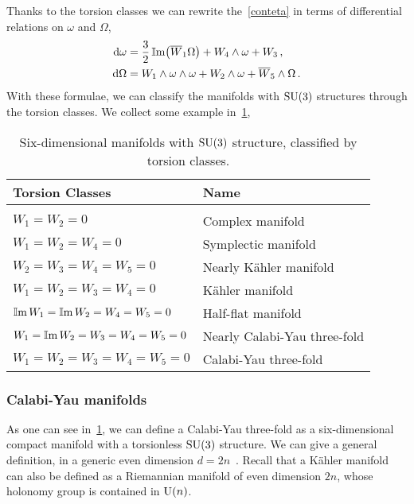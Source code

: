 \documentclass[debug]{phd}
\begin{document}
				Thanks to the torsion classes we can rewrite the~\eqref{conteta} in terms of differential relations on $\omega$ and $\Omega$,
						\begin{subequations}
						\label{diffstruct}
							\begin{align}
								\dd \omega 	&= \frac{3}{2} \IIm \left( \overline{W}_1 \Omega \right) + W_4 \wedge \omega + W_3 \, , \\
								\dd \Omega	&= W_1 \wedge \omega \wedge \omega + W_2 \wedge \omega + \overline{W}_5 \wedge \Omega \, .
							\end{align}
						\end{subequations}
				With these formulae, we can classify the manifolds with $\mathrm{SU}(3)$ structures through the torsion classes.
				We collect some example in~\cref{tabTorsCl},
						\begin{table}[h!]
						\centering
							\begin{tabular}{l | l}
								Torsion Classes						&			Name							\\
								\hline
																	&											\\[-.3mm]
								$W_1 = W_2 = 0$						& 			Complex manifold					\\[1.5mm]	
								$W_1 = W_2 = W_4 = 0$					&			Symplectic manifold					\\[1.5mm]	
								$W_2 = W_3 = W_4 = W_5 = 0$ 			&			Nearly K\"ahler	manifold				\\[1.5mm]
								$W_1 = W_2 = W_3 = W_4 = 0$			&			K\"ahler manifold					\\[1.5mm]	
								$\operatorname{\mathbb{I}m} W_1 = \operatorname{\mathbb{I}m} W_2 = W_4 = W_5 = 0$		&			Half-flat manifold					\\[1.5mm]
								$W_1 = \operatorname{\mathbb{I}m} W_2 = W_3 = W_4 = W_5 = 0$ 	&			Nearly Calabi-Yau three-fold			\\[1.5mm]	
								$W_1 = W_2 = W_3 = W_4 = W_5 = 0$ 		&			Calabi-Yau three-fold					
							\end{tabular}
							\caption{Six-dimensional manifolds with $\mathrm{SU}(3)$ structure, classified by torsion classes.}
							\label{tabTorsCl}
						\end{table}
				\subsubsection{Calabi-Yau manifolds}
					As one can see in~\cref{tabTorsCl}, we can define a Calabi-Yau three-fold as a six-dimensional compact manifold with a torsionless $\mathrm{SU}(3)$ structure.
					We can give a general definition, in a generic even dimension $d= 2n$~\cite{joyce, joyceLagrang}.
					Recall that a K\"ahler manifold can also be defined as a Riemannian manifold of even dimension $2n$, whose holonomy group is contained in $\mathrm{U}(n)$.
\end{document}
